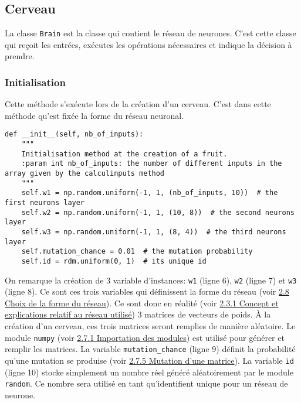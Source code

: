 \documentclass[12pt, a4paper, openany]{book}
\begin{document}
\subsection{Cerveau}
\label{r:2.7.5}
La classe \verb'Brain' est la classe qui contient le réseau de neurones. C'est cette classe qui reçoit les entrées, exécutes les opérations nécessaires et indique la décision à prendre.

\subsubsection{Initialisation}
\label{r:2.7.5-ini}
Cette méthode s'exécute lors de la création d'un cerveau. C'est dans cette méthode qu'est fixée la forme du réseau neuronal.
\begin{verbatim}
def __init__(self, nb_of_inputs):
    """
    Initialisation method at the creation of a fruit.
    :param int nb_of_inputs: the number of different inputs in the array given by the calculinputs method
    """
    self.w1 = np.random.uniform(-1, 1, (nb_of_inputs, 10))  # the first neurons layer
    self.w2 = np.random.uniform(-1, 1, (10, 8))  # the second neurons layer
    self.w3 = np.random.uniform(-1, 1, (8, 4))  # the third neurons layer
    self.mutation_chance = 0.01  # the mutation probability
    self.id = rdm.uniform(0, 1)  # its unique id
\end{verbatim}
On remarque la création de 3 variable d'instances: \verb'w1' (ligne 6), \verb'w2' (ligne 7) et \verb'w3' (ligne 8). Ce sont ces trois variables qui définissent la forme du réseau (voir \hyperref[r:2.8]{2.8 Choix de la forme du réseau}). Ce sont donc en réalité (voir \hyperref[r:2.3.1]{2.3.1 Concept et explications relatif au réseau utilisé}) 3 matrices de vecteurs de poids. À la création d'un cerveau, ces trois matrices seront remplies de manière aléatoire. Le module \verb'numpy' (voir \hyperref[r:2.7.1-imp]{2.7.1 Importation des modules}) est utilisé pour générer et remplir les matrices. La variable \verb'mutation_chance' (ligne 9) définit la probabilité qu'une mutation se produise (voir \hyperref[r:2.7.5-mat]{2.7.5 Mutation d'une matrice}). La variable \verb'id' (ligne 10) stocke simplement un nombre réel généré aléatoirement par le module \verb'random'. Ce nombre sera utilisé en tant qu’identifient unique pour un réseau de neurone.
\end{document}
